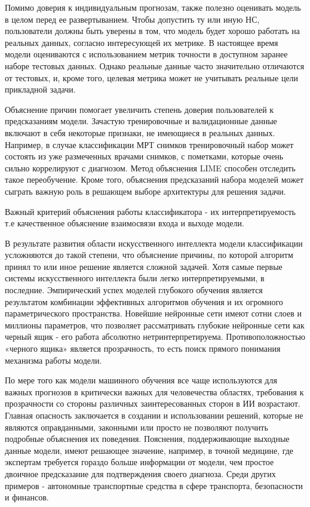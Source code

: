 \documentclass[oneside,final,14pt]{extreport}
\begin{document}
Помимо доверия к индивидуальным прогнозам, также полезно оценивать модель в целом перед ее развертыванием. Чтобы допустить ту или иную НС, пользователи должны быть уверены в том, что модель будет хорошо работать на реальных данных, согласно интересующей их метрике. В настоящее время модели оцениваются с использованием метрик точности в доступном заранее наборе тестовых данных. Однако реальные данные часто значительно отличаются от тестовых, и, кроме того, целевая метрика может не учитывать реальные цели прикладной задачи.

Объяснение причин помогает увеличить степень доверия пользователей к предсказаниям модели. Зачастую тренировочные и валидационные данные включают в себя некоторые признаки, не имеющиеся в реальных данных. Например, в случае классификации МРТ снимков тренировочный набор может состоять из уже размеченных врачами снимков, с пометками, которые очень сильно коррелируют с диагнозом. Метод объяснения LIME способен отследить такое переобучение. Кроме того, объяснения предсказаний набора моделей может сыграть важную роль в решающем выборе архитектуры для решения задачи. 

Важный критерий объяснения работы классификатора - их интерпретируемость т.е качественное объяснение взаимосвязи входа и выходе модели.

В результате развития области искусственного интеллекта модели классификации усложняются до такой степени, что объяснение причины, по которой алгоритм принял то или иное решение является сложной задачей. Хотя самые первые системы искусственного интеллекта были легко интерпретируемыми, в последние. Эмпирический успех моделей глубокого обучения является результатом комбинации эффективных алгоритмов обучения и их огромного параметрического пространства. Новейшие нейронные сети имеют сотни слоев и миллионы параметров, что позволяет рассматривать глубокие нейронные сети как черный ящик - его работа абсолютно нетринтерпретируема. Противоположностью «черного ящика» является прозрачность, то есть поиск прямого понимания механизма работы модели.

По мере того как модели машинного обучения все чаще используются для важных прогнозов в критически важных для человечества областях, требования к прозрачности со стороны различных заинтересованных сторон в ИИ возрастают. Главная опасность заключается в создании и использовании решений, которые не являются оправданными, законными или просто не позволяют получить подробные объяснения их поведения. Пояснения, поддерживающие выходные данные модели, имеют решающее значение, например, в точной медицине, где экспертам требуется гораздо больше информации от модели, чем простое двоичное предсказание для подтверждения своего диагноза. Среди других примеров - автономные транспортные средства в сфере транспорта, безопасности и финансов.
\end{document}
